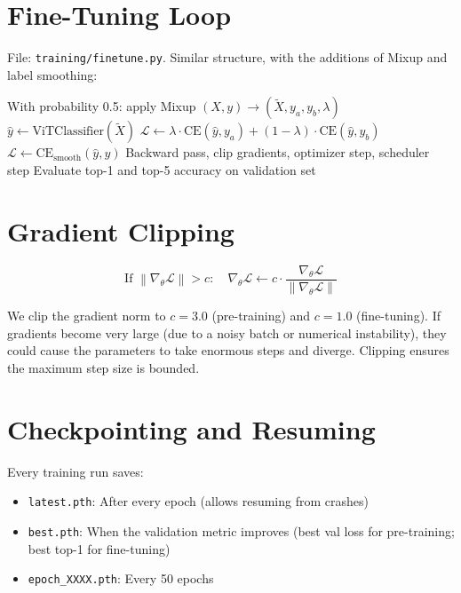 \documentclass[12pt, a4paper]{report}
\newcommand{\norm}[1]{\left\lVert #1 \right\rVert}
\begin{document}
\section{Fine-Tuning Loop}

File: \texttt{training/finetune.py}. Similar structure, with the additions of Mixup and label smoothing:

\begin{algorithm}[H]
\caption{Fine-Tuning (one epoch)}
\begin{algorithmic}[1]
    \State With probability 0.5: apply Mixup $(X, y) \to (\tilde{X}, y_a, y_b, \lambda)$
    \State $\hat{y} \gets \text{ViTClassifier}(\tilde{X})$ 
        \State $\mathcal{L} \gets \lambda \cdot \text{CE}(\hat{y}, y_a) + (1-\lambda)\cdot\text{CE}(\hat{y}, y_b)$
    \Else
        \State $\mathcal{L} \gets \text{CE}_{\text{smooth}}(\hat{y}, y)$
    \EndIf
    \State Backward pass, clip gradients, optimizer step, scheduler step
\EndFor
\State Evaluate top-1 and top-5 accuracy on validation set
\end{algorithmic}
\end{algorithm}

\section{Gradient Clipping}

\begin{equation}
\text{If } \norm{\nabla_\theta \mathcal{L}} > c : \quad \nabla_\theta \mathcal{L} \leftarrow c \cdot \frac{\nabla_\theta \mathcal{L}}{\norm{\nabla_\theta \mathcal{L}}}
\end{equation}

We clip the gradient norm to $c = 3.0$ (pre-training) and $c = 1.0$ (fine-tuning). If gradients become very large (due to a noisy batch or numerical instability), they could cause the parameters to take enormous steps and diverge. Clipping ensures the maximum step size is bounded.

\section{Checkpointing and Resuming}

Every training run saves:
\begin{itemize}
    \item \texttt{latest.pth}: After every epoch (allows resuming from crashes)
    \item \texttt{best.pth}: When the validation metric improves (best val loss for pre-training; best top-1 for fine-tuning)
    \item \texttt{epoch\_XXXX.pth}: Every 50 epochs
\end{itemize}
\end{document}

